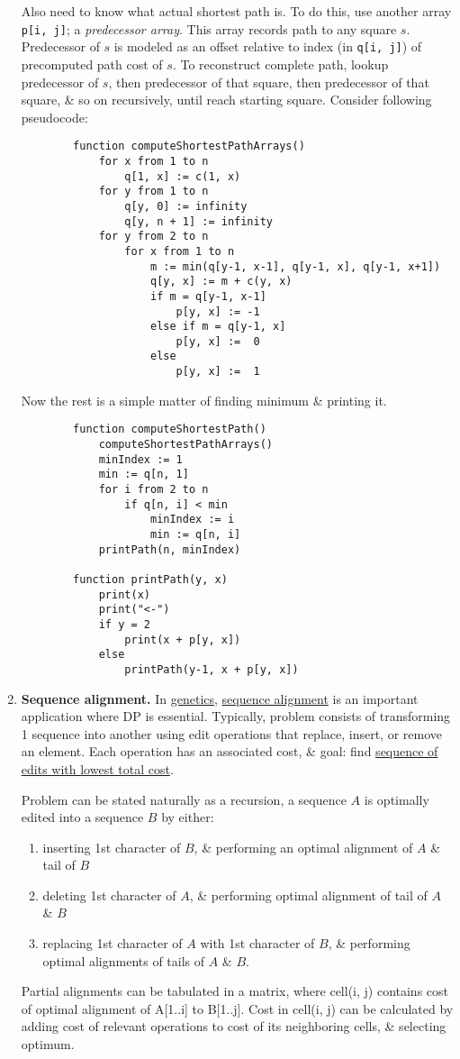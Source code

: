 \documentclass{article}
\begin{document}
\begin{enumerate}
	Also need to know what actual shortest path is. To do this, use another array {\tt p[i, j]}; a {\it predecessor array}. This array records path to any square $s$. Predecessor of $s$ is modeled as an offset relative to index (in {\tt q[i, j]}) of precomputed path cost of $s$. To reconstruct complete path, lookup predecessor of $s$, then predecessor of that square, then predecessor of that square, \& so on recursively, until reach starting square. Consider following pseudocode:
	\begin{verbatim}
		function computeShortestPathArrays()
		    for x from 1 to n
		        q[1, x] := c(1, x)
		    for y from 1 to n
		        q[y, 0] := infinity
		        q[y, n + 1] := infinity
		    for y from 2 to n
		        for x from 1 to n
		            m := min(q[y-1, x-1], q[y-1, x], q[y-1, x+1])
		            q[y, x] := m + c(y, x)
		            if m = q[y-1, x-1]
		                p[y, x] := -1
		            else if m = q[y-1, x]
		                p[y, x] :=  0
		            else
		                p[y, x] :=  1
	\end{verbatim}
	Now the rest is a simple matter of finding minimum \& printing it.
	\begin{verbatim}
		function computeShortestPath()
		    computeShortestPathArrays()
		    minIndex := 1
		    min := q[n, 1]
		    for i from 2 to n
		        if q[n, i] < min
		            minIndex := i
		            min := q[n, i]
		    printPath(n, minIndex)
		
		function printPath(y, x)
		    print(x)
		    print("<-")
		    if y = 2
		        print(x + p[y, x])
		    else
		        printPath(y-1, x + p[y, x])
	\end{verbatim}
	\item {\bf Sequence alignment.} In \href{https://en.wikipedia.org/wiki/Genetics}{genetics}, \href{https://en.wikipedia.org/wiki/Sequence_alignment}{sequence alignment} is an important application where DP is essential. Typically, problem consists of transforming 1 sequence into another using edit operations that replace, insert, or remove an element. Each operation has an associated cost, \& goal: find \href{https://en.wikipedia.org/wiki/Edit_distance}{sequence of edits with lowest total cost}.
	
	Problem can be stated naturally as a recursion, a sequence $A$ is optimally edited into a sequence $B$ by either:
	\begin{enumerate}
		\item inserting 1st character of $B$, \& performing an optimal alignment of $A$ \& tail of $B$
		\item deleting 1st character of $A$, \& performing optimal alignment of tail of $A$ \& $B$
		\item replacing 1st character of $A$ with 1st character of $B$, \& performing optimal alignments of tails of $A$ \& $B$.
	\end{enumerate}
	Partial alignments can be tabulated in a matrix, where cell(i, j) contains cost of optimal alignment of A[1..i] to B[1..j]. Cost in cell(i, j) can be calculated by adding cost of relevant operations to cost of its neighboring cells, \& selecting optimum.
	

\end{enumerate}
\end{document}
